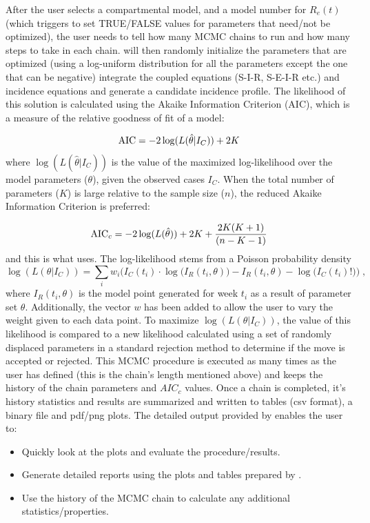 \documentclass[a4paper]{article}
\begin{document}
After the user selects a compartmental model, and a model number for $R_e(t)$ (which triggers  to set TRUE/FALSE values for parameters that need/not be optimized), the user needs to tell  how
many MCMC chains to run and how many steps to take in each
chain.  will then randomly initialize the parameters that are
optimized (using a log-uniform distribution for all the parameters
except the one that can be negative) integrate the coupled equations (S-I-R, S-E-I-R etc.) and
incidence equations and generate a candidate incidence profile. The
likelihood of this solution is calculated using the Akaike Information Criterion (AIC), which is a measure of the relative goodness of fit of a model:

\begin{equation}
{\rm AIC} = -2 \log (L(\hat{\theta}| I_C)) + 2 K
\label{eq-aic1}
\end{equation}
where $\log (L(\hat{\theta} | I_C))$ is the value of the maximized log-likelihood over the model parameters ($\theta$), given the observed cases $I_C$.
When the total number of parameters ($K$) is large relative to the sample size ($n$), the reduced Akaike Information Criterion is preferred:

\begin{equation}
{\rm AIC}_c = -2 \log (L(\hat{\theta})) + 2 K + \frac{2 K (K+1)}{(n - K - 1)}
\label{eq-aic2}
\end{equation}
and this is what  uses.   The log-likelihood stems from a Poisson probability density
\begin{equation}
  \log (L(\theta| I_C)) = \sum_i w_i \Big(I_C(t_i)\cdot \log\big(I_R(t_i,\theta)\big) - I_R(t_i,\theta) - \log\big(I_C(t_i)!\big) \Big)\;,
  \label{eq-wLLK}
\end{equation}
where $I_R(t_i,\theta)$ is the model point generated for week $t_i$ as a result of parameter set $\theta$. Additionally, the vector $w$ has been added to allow the user to vary the weight given to each data point. To maximize $\log (L(\theta| I_C))$, the value of this likelihood is compared to a new likelihood calculated using a set of randomly displaced parameters in a standard rejection method to determine if the move is accepted or rejected.  This MCMC procedure is executed as
many times as the user has defined (this is the chain's length mentioned above) and  keeps the history of the chain parameters and $AIC_c$ values.
Once a chain is completed, it's history statistics and results are summarized and written to tables (csv format), a binary  file and pdf/png plots.
The detailed output provided by  enables the user to:
\begin{itemize}
  \item Quickly look at the plots and evaluate the procedure/results.
  \item Generate detailed reports using the plots and tables prepared by .
  \item Use the history of the MCMC chain to calculate any additional statistics/properties.
\end{itemize}
\end{document}
